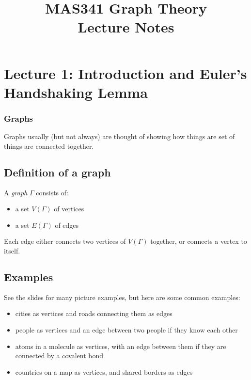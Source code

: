 \documentclass[]{article}
\title{MAS341 Graph Theory \\ Lecture Notes}
\date{}
\providecommand{\tightlist}{%
  \setlength{\itemsep}{0pt}\setlength{\parskip}{0pt}}
\begin{document}
\maketitle
\tableofcontents


\section{Lecture 1: Introduction and Euler's Handshaking Lemma}
\subsubsection{Graphs}\label{graphs}

Graphs usually (but not always) are thought of showing how things are
set of things are connected together.

\subsection{Definition of a graph}\label{definition-of-a-graph}

A \emph{graph} \(\Gamma\) consists of:

\begin{itemize}
\tightlist
\item
  a set \(V(\Gamma)\) of vertices
\item
  a set \(E(\Gamma)\) of edges
\end{itemize}

Each edge either connects two vertices of \(V(\Gamma)\) together, or
connects a vertex to itself.

\subsection{Examples}\label{examples}

See the slides for many picture examples, but here are some common
examples:

\begin{itemize}
\tightlist
\item
  cities as vertices and roads connecting them as edges
\item
  people as vertices and an edge between two people if they know each
  other
\item
  atoms in a molecule as vertices, with an edge between them if they are
  connected by a covalent bond
\item
  countries on a map as vertices, and shared borders as edges
\end{itemize}
\end{document}
